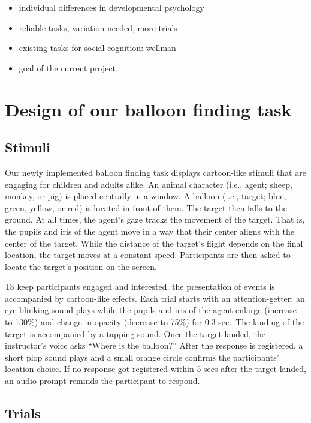 \documentclass[
  english,
  man,floatsintext]{apa6}
\providecommand{\tightlist}{%
  \setlength{\itemsep}{0pt}\setlength{\parskip}{0pt}}
\begin{document}
\begin{itemize}
\tightlist
\item
  individual differences in developmental psychology
\item
  reliable tasks, variation needed, more trials
\item
  existing tasks for social cognition: wellman
\item
  goal of the current project
\end{itemize}

\hypertarget{design-of-our-balloon-finding-task}{%
\section{Design of our balloon finding task}\label{design-of-our-balloon-finding-task}}

\hypertarget{stimuli}{%
\subsection{Stimuli}\label{stimuli}}

Our newly implemented balloon finding task displays cartoon-like stimuli that are engaging for children and adults alike. An animal character (i.e., agent; sheep, monkey, or pig) is placed centrally in a window. A balloon (i.e., target; blue, green, yellow, or red) is located in front of them. The target then falls to the ground. At all times, the agent's gaze tracks the movement of the target. That is, the pupils and iris of the agent move in a way that their center aligns with the center of the target. While the distance of the target's flight depends on the final location, the target moves at a constant speed. Participants are then asked to locate the target's position on the screen.

To keep participants engaged and interested, the presentation of events is accompanied by cartoon-like effects. Each trial starts with an attention-getter: an eye-blinking sound plays while the pupils and iris of the agent enlarge (increase to 130\%) and change in opacity (decrease to 75\%) for 0.3 sec.~The landing of the target is accompanied by a tapping sound. Once the target landed, the instructor's voice asks ``Where is the balloon?'' After the response is registered, a short plop sound plays and a small orange circle confirms the participants' location choice. If no response got registered within 5 secs after the target landed, an audio prompt reminds the participant to respond.

\hypertarget{trials}{%
\subsection{Trials}\label{trials}}
\end{document}
